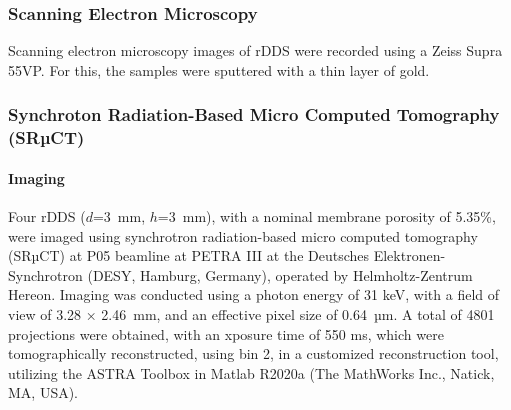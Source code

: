 \subsubsection{Scanning Electron Microscopy}
Scanning electron microscopy images of rDDS were recorded using a Zeiss Supra 55VP. For this, the samples were sputtered with a thin layer of gold.

\subsubsection{Synchroton Radiation-Based Micro Computed Tomography (SRµCT)}

\paragraph{Imaging}
Four rDDS ($d$=3~mm, $h$=3~mm), with a nominal membrane porosity of 5.35\%, were imaged using synchrotron radiation-based micro computed tomography (SRµCT) at P05 beamline at PETRA III at the Deutsches Elektronen-Synchrotron (DESY, Hamburg, Germany), operated by Helmholtz-Zentrum Hereon. Imaging was conducted using a photon energy of 31 keV, with a field of view of 3.28 × 2.46~mm, and an effective pixel size of 0.64~µm. A total of 4801 projections were obtained, with an xposure time of 550 ms, which were tomographically reconstructed, using bin 2, in a customized reconstruction tool\supercite{moosmann2014time}, utilizing the ASTRA Toolbox\supercite{van2015astra,van2016fast} in Matlab R2020a (The MathWorks Inc., Natick, MA, USA).

